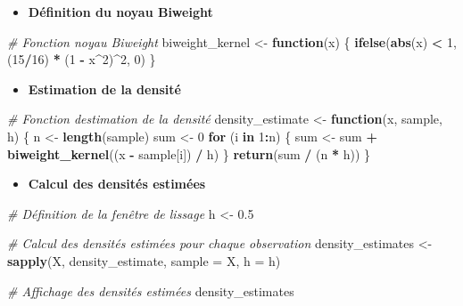 \documentclass[
  12pt,
]{article}
\newenvironment{Shaded}{\begin{snugshade}}{\end{snugshade}}
\newcommand{\AttributeTok}[1]{\textcolor[rgb]{0.13,0.29,0.53}{#1}}
\newcommand{\CommentTok}[1]{\textcolor[rgb]{0.56,0.35,0.01}{\textit{#1}}}
\newcommand{\ControlFlowTok}[1]{\textcolor[rgb]{0.13,0.29,0.53}{\textbf{#1}}}
\newcommand{\DecValTok}[1]{\textcolor[rgb]{0.00,0.00,0.81}{#1}}
\newcommand{\FloatTok}[1]{\textcolor[rgb]{0.00,0.00,0.81}{#1}}
\newcommand{\FunctionTok}[1]{\textcolor[rgb]{0.13,0.29,0.53}{\textbf{#1}}}
\newcommand{\NormalTok}[1]{#1}
\newcommand{\OtherTok}[1]{\textcolor[rgb]{0.56,0.35,0.01}{#1}}
\newcommand{\SpecialCharTok}[1]{\textcolor[rgb]{0.81,0.36,0.00}{\textbf{#1}}}
\providecommand{\tightlist}{%
  \setlength{\itemsep}{0pt}\setlength{\parskip}{0pt}}
\begin{document}
\begin{itemize}
\tightlist
\item
  \textbf{Définition du noyau Biweight}
\end{itemize}

\begin{Shaded}
\begin{Highlighting}[]
\CommentTok{\# Fonction noyau Biweight}
\NormalTok{biweight\_kernel }\OtherTok{\textless{}{-}} \ControlFlowTok{function}\NormalTok{(x) \{}
  \FunctionTok{ifelse}\NormalTok{(}\FunctionTok{abs}\NormalTok{(x) }\SpecialCharTok{\textless{}} \DecValTok{1}\NormalTok{, (}\DecValTok{15}\SpecialCharTok{/}\DecValTok{16}\NormalTok{) }\SpecialCharTok{*}\NormalTok{ (}\DecValTok{1} \SpecialCharTok{{-}}\NormalTok{ x}\SpecialCharTok{\^{}}\DecValTok{2}\NormalTok{)}\SpecialCharTok{\^{}}\DecValTok{2}\NormalTok{, }\DecValTok{0}\NormalTok{)}
\NormalTok{\}}
\end{Highlighting}
\end{Shaded}

\begin{itemize}
\tightlist
\item
  \textbf{Estimation de la densité}
\end{itemize}

\begin{Shaded}
\begin{Highlighting}[]
\CommentTok{\# Fonction d\textquotesingle{}estimation de la densité}
\NormalTok{density\_estimate }\OtherTok{\textless{}{-}} \ControlFlowTok{function}\NormalTok{(x, sample, h) \{}
\NormalTok{  n }\OtherTok{\textless{}{-}} \FunctionTok{length}\NormalTok{(sample)}
\NormalTok{  sum }\OtherTok{\textless{}{-}} \DecValTok{0}
  \ControlFlowTok{for}\NormalTok{ (i }\ControlFlowTok{in} \DecValTok{1}\SpecialCharTok{:}\NormalTok{n) \{}
\NormalTok{    sum }\OtherTok{\textless{}{-}}\NormalTok{ sum }\SpecialCharTok{+} \FunctionTok{biweight\_kernel}\NormalTok{((x }\SpecialCharTok{{-}}\NormalTok{ sample[i]) }\SpecialCharTok{/}\NormalTok{ h)}
\NormalTok{  \}}
  \FunctionTok{return}\NormalTok{(sum }\SpecialCharTok{/}\NormalTok{ (n }\SpecialCharTok{*}\NormalTok{ h))}
\NormalTok{\}}
\end{Highlighting}
\end{Shaded}

\begin{itemize}
\tightlist
\item
  \textbf{Calcul des densités estimées}
\end{itemize}

\begin{Shaded}
\begin{Highlighting}[]
\CommentTok{\# Définition de la fenêtre de lissage}
\NormalTok{h }\OtherTok{\textless{}{-}} \FloatTok{0.5}

\CommentTok{\# Calcul des densités estimées pour chaque observation}
\NormalTok{density\_estimates }\OtherTok{\textless{}{-}} \FunctionTok{sapply}\NormalTok{(X, density\_estimate, }\AttributeTok{sample =}\NormalTok{ X, }\AttributeTok{h =}\NormalTok{ h)}

\CommentTok{\# Affichage des densités estimées}
\NormalTok{density\_estimates}
\end{Highlighting}
\end{Shaded}
\end{document}
